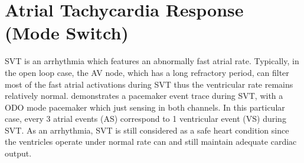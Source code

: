 \section{Atrial Tachycardia Response (Mode Switch)}
SVT is an arrhythmia which features an abnormally fast atrial rate. %
Typically, in the open loop case, the AV node, which has a long refractory period, can filter most of the fast atrial activations during SVT thus the ventricular rate remains relatively normal.  demonstrates a pacemaker event trace during SVT, with a ODO mode pacemaker which just sensing in both channels. In this particular case, every 3 atrial events (AS) correspond to 1 ventricular event (VS) during SVT. 
As an arrhythmia, SVT is still considered as a safe heart condition since the ventricles operate under normal rate can and still maintain adequate cardiac output. 

